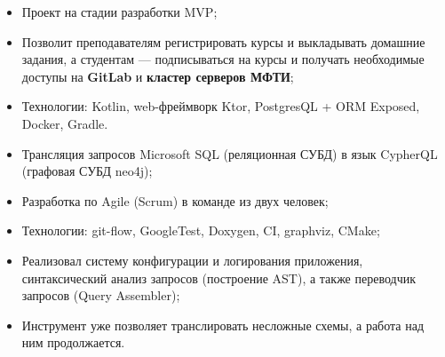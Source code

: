 \documentclass[10pt,a4paper,ragged2e,withhyper]{custom-altacv}
\begin{document}
\begin{paracol}{2}


\begin{itemize}
	\item Проект на стадии разработки MVP;
	\item Позволит преподавателям регистрировать курсы и выкладывать домашние задания, а студентам --- подписываться на курсы и получать необходимые доступы на \textbf{GitLab} и \textbf{кластер серверов МФТИ};
	\item Технологии: Kotlin, web-фреймворк Ktor, PostgresQL + ORM Exposed, Docker, Gradle.
\end{itemize}

\divider


\begin{itemize}
	\item Трансляция запросов Microsoft SQL (реляционная СУБД) в язык CypherQL (графовая СУБД neo4j);
	\item Разработка по Agile (Scrum) в команде из двух человек;
	\item Технологии: git-flow, GoogleTest, Doxygen, CI, graphviz, CMake;
	\item Реализовал систему конфигурации и логирования приложения, синтаксический анализ запросов (построение AST), а также переводчик запросов (Query Assembler);
	\item Инструмент уже позволяет транслировать несложные схемы, а работа над ним продолжается.
\end{itemize}

\iffalse
\divider

\cvproject{Эмулятор PDP-11 \cvtag{C}}{Курсовая работа в МФТИ}{Апрель -- Июль 2021}{pdp11-emulator}{https://github.com/temikfart/pdp11-emulator/}

\begin{itemize}
	\item Работа была сделана в соотстветсвии с техническим заданием;
	\item Был разработан обширная функциональность: множество команд для исполнения, слова состояния процессора и т.д.
\end{itemize}
\fi



\end{paracol}
\end{document}
